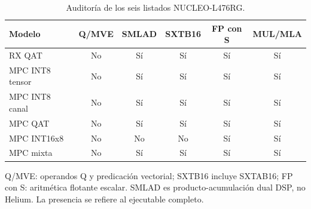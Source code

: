 \begin{table}[H]\centering\small
\caption{Auditoría de los seis listados NUCLEO-L476RG.}\label{tab:list_nucleo}
\begin{tabularx}{\linewidth}{Xccccc}\toprule
Modelo & Q/MVE & SMLAD & SXTB16 & FP con S & MUL/MLA\\\midrule
RX QAT & No & Sí & Sí & Sí & Sí\\
MPC INT8 tensor & No & Sí & Sí & Sí & Sí\\
MPC INT8 canal & No & Sí & Sí & Sí & Sí\\
MPC QAT & No & Sí & Sí & Sí & Sí\\
MPC INT16x8 & No & No & No & Sí & Sí\\
MPC mixta & No & Sí & Sí & Sí & Sí\\
\bottomrule\end{tabularx}
\par\smallskip\begin{minipage}{\linewidth}\footnotesize Q/MVE: operandos Q y predicación vectorial; SXTB16 incluye SXTAB16; FP con S: aritmética flotante escalar. SMLAD es producto-acumulación dual DSP, no Helium. La presencia se refiere al ejecutable completo.\end{minipage}
\end{table}